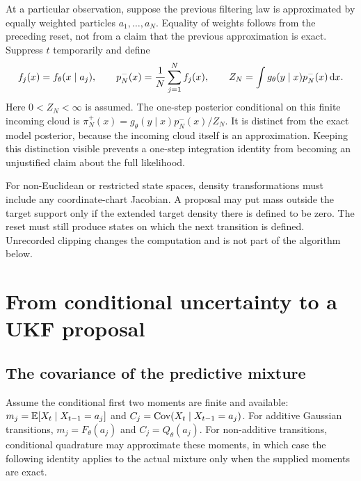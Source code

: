 At a particular observation, suppose the previous filtering law is
approximated by equally weighted particles \(a_1,\ldots,a_N\). Equality of
weights follows from the preceding reset, not from a claim that the previous
approximation is exact. Suppress \(t\) temporarily and define
\begin{equation}
\label{eq:bf-covariance-proposal-finite-target}
 f_j(x)=f_\theta(x\mid a_j),\qquad
 p_N^-(x)=\frac1N\sum_{j=1}^N f_j(x),\qquad
 Z_N=\int g_\theta(y\mid x)p_N^-(x)\,\mathrm d x .
\end{equation}
Here \(0<Z_N<\infty\) is assumed. The one-step posterior conditional on this
finite incoming cloud is
\(\pi_N^+(x)=g_\theta(y\mid x)p_N^-(x)/Z_N\).
It is distinct from the exact model posterior, because the incoming cloud
itself is an approximation. Keeping this distinction visible prevents a
one-step integration identity from becoming an unjustified claim about the
full likelihood.

For non-Euclidean or restricted state spaces, density transformations must
include any coordinate-chart Jacobian. A proposal may put mass outside the
target support only if the extended target density there is defined to be
zero. The reset must still produce states on which the next transition is
defined. Unrecorded clipping changes the computation and is not part of the
algorithm below.

\section{From conditional uncertainty to a UKF proposal}

\subsection{The covariance of the predictive mixture}

Assume the conditional first two moments are finite and available:
\(m_j=\mathbb E[X_t\mid X_{t-1}=a_j]\) and
\(C_j=\operatorname{Cov}(X_t\mid X_{t-1}=a_j)\).
For additive Gaussian transitions, \(m_j=F_\theta(a_j)\) and
\(C_j=Q_\theta(a_j)\). For non-additive transitions, conditional quadrature
may approximate these moments, in which case the following identity applies
to the actual mixture only when the supplied moments are exact.

